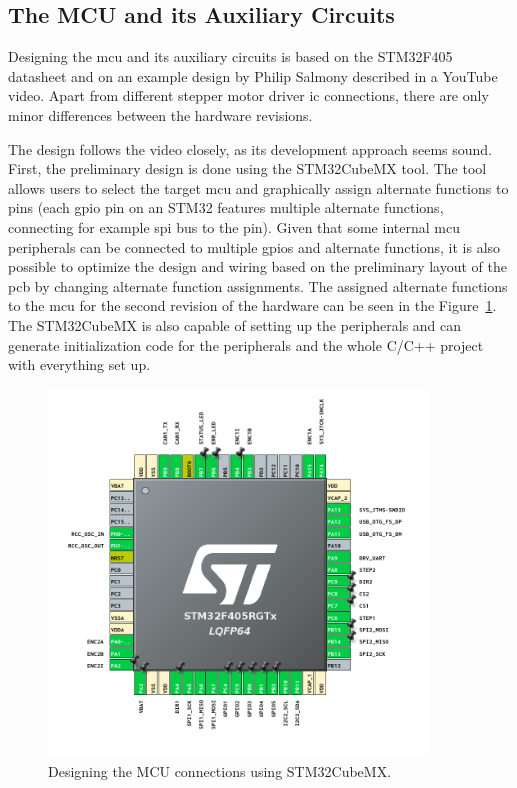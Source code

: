 \subsection{The MCU and its Auxiliary Circuits}
\label{subsec:mcu_design}
Designing the \acs{mcu} and its auxiliary circuits is based on the STM32F405 datasheet\cite{stmicro_stm32f405xx_2020} and on an example design by Philip Salmony described in a YouTube video\cite{salmony_kicad_2020}.
Apart from different stepper motor driver \acs{ic} connections, there are only minor differences between the hardware revisions.

The design follows the video closely, as its development approach seems sound.
First, the preliminary design is done using the STM32CubeMX tool.
The tool allows users to select the target \acs{mcu} and graphically assign alternate functions to pins (each \acs{gpio} pin on an STM32 features multiple alternate functions, connecting for example \acs{spi} bus to the pin).
Given that some internal \acs{mcu} peripherals can be connected to multiple \acs{gpio}s and alternate functions, it is also possible to optimize the design and wiring based on the preliminary layout of the \acs{pcb} by changing alternate function assignments.
The assigned alternate functions to the \acs{mcu} for the second revision of the hardware can be seen in the Figure~\ref{fig:cubemx}.
The STM32CubeMX is also capable of setting up the peripherals and can generate initialization code for the peripherals and the whole C/C++ project with everything set up.

\begin{figure}[H]
    \centering
    \includegraphics[width=0.9\textwidth]{obrazky/cube_mx}
    \caption{Designing the MCU connections using STM32CubeMX.}
    \label{fig:cubemx}
\end{figure}

